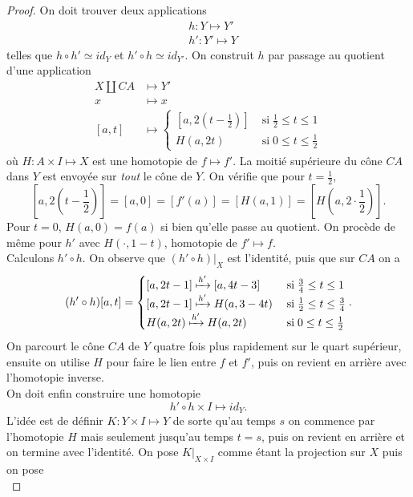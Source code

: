 \documentclass[main.tex]{subfiles}
\begin{document}
	\begin{proof}
		On doit trouver deux applications
		\begin{align*}
			&h : Y \longmapsto Y' \\
			&h' : Y' \longmapsto Y
		\end{align*}
		telles que $h\circ h' \simeq id_Y$ et $h'\circ h \simeq id_{Y'}$. 
		On construit $h$ par passage au quotient d'une application 
		 \begin{align*}
			 X \amalg CA &\longmapsto Y' \\
				 x&\longmapsto x \\
				 [a,t]& \longmapsto \begin{cases}
					 [a,2(t-\frac{1}{2})] \; &\text{si} \; \frac{1}{2} \le t \le 1 \\
					 H(a,2t) \; &\text{si} \; 0 \le t \le \frac{1}{2}
			 \end{cases}
		\end{align*}
		où $H : A \times I \longmapsto X$ est une homotopie de $f \longmapsto f'$.
		La moitié supérieure du cône $CA$ dans $Y$ est envoyée sur \emph{tout} le cône de $Y$. On vérifie que pour $t=\frac{1}{2}$, \[[a,2(t-\frac{1}{2})] = [a,0] = [f'(a)] = [H(a,1)] = [H(a,2\cdot \frac{1}{2})].\]
		Pour $t=0$, $H(a,0) = f(a)$ si bien qu'elle passe au quotient. On procède de même pour $h'$ avec $H(\cdot , 1-t)$, homotopie de  $f' \longmapsto f$. \\
		Calculons $h' \circ h$. On observe que $(h'\circ h)|_X$ est l'identité, puis que sur $CA$ on a \[
			(h'\circ h)[a,t] = \begin{cases}
				[a,2t-1] \xmapsto{h'} [a,4t-3] \; &\text{si} \; \frac{3}{4} \le t \le 1 \\
				[a,2t-1] \xmapsto{h'} H(a,3-4t) \; &\text{si} \; \frac{1}{2} \le t \le \frac{3}{4} \\
				H(a,2t) \xmapsto{h'} H(a,2t) \; &\text{si} \; 0 \le t \le \frac{1}{2}
			\end{cases}
		.\] 
		On parcourt le cône $CA$ de $Y$ quatre fois plus rapidement sur le quart supérieur, ensuite on utilise $H$ pour faire le lien entre $f$ et $f'$, puis on revient en arrière avec l'homotopie inverse. \\
		On doit enfin construire une homotopie \[
			h'\circ h \times I \longmapsto id_{Y}
		.\] 
		L'idée est de définir $K : Y \times I \longmapsto Y$ de sorte qu'au temps $s$ on commence par l'homotopie $H$ mais seulement jusqu'au temps $t=s$, puis on revient en arrière et on termine avec l'identité.
		On pose $K|_{X\times I}$ comme étant la projection sur $X$ puis on pose  \[
\]
\end{proof}
\end{document}
